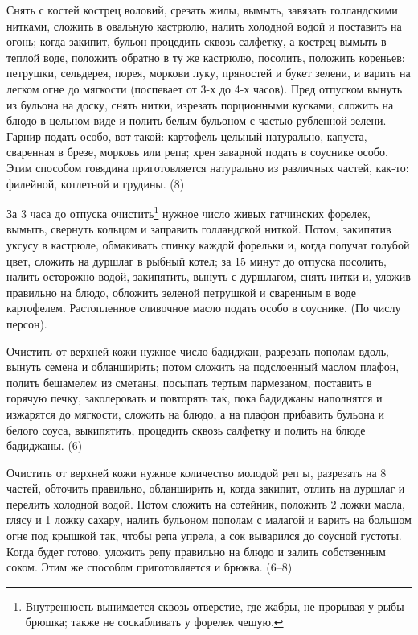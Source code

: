
Снять с костей кострец воловий, срезать жилы, вымыть, завязать голландскими нитками, сложить в овальную кастрюлю, налить холодной водой и поставить на огонь; когда закипит, бульон процедить сквозь салфетку, а кострец вымыть в теплой воде, положить обратно в ту же кастрюлю, посолить, положить кореньев: петрушки, сельдерея, порея, моркови луку, пряностей и букет зелени, и варить на легком огне до мягкости (поспевает от 3-х до 4-х часов). Пред отпуском вынуть из бульона на доску, снять нитки, изрезать порционными кусками, сложить на блюдо в цельном виде и полить белым бульоном с частью рубленной зелени. Гарнир подать особо, вот такой: картофель цельный натурально, капуста, сваренная в брезе, морковь или репа; хрен заварной подать в соуснике особо. Этим способом говядина приготовляется натурально из различных частей, как-то: филейной, котлетной и грудины. (8) 


За 3 часа до отпуска очистить\footnote{Внутренность вынимается сквозь отверстие, где жабры, не прорывая у рыбы брюшка; также не соскабливать у форелек чешую.} нужное число живых гатчинских форелек, вымыть, свернуть кольцом и заправить голландской ниткой. Потом, закипятив уксусу в кастрюле, обмакивать спинку каждой форельки и, когда получат голубой цвет, сложить на дуршлаг в рыбный котел; за 15 минут до отпуска посолить, налить осторожно водой, закипятить, вынуть с дуршлагом, снять нитки и, уложив правильно на блюдо, обложить зеленой петрушкой и сваренным в воде картофелем. Растопленное сливочное масло подать особо в соуснике. (По числу персон). 


Очистить от верхней кожи нужное число бадиджан, разрезать пополам вдоль, вынуть семена и обланширить; потом сложить на подслоенный маслом плафон, полить бешамелем из сметаны, посыпать тертым пармезаном, поставить в горячую печку, заколеровать и повторять так, пока бадиджаны наполнятся и изжарятся до мягкости, сложить на блюдо, а на плафон прибавить бульона и белого соуса, выкипятить, процедить сквозь салфетку и полить на блюде бадиджаны. (6)


Очистить от верхней кожи нужное количество молодой реп ы, разрезать на 8 частей, обточить правильно, обланширить и, когда закипит, отлить на дуршлаг и перелить холодной водой. Потом сложить на сотейник, положить 2 ложки масла, глясу и 1 ложку сахару, налить бульоном пополам с малагой и варить на большом огне под крышкой так, чтобы репа упрела, а сок выварился до соусной густоты. Когда будет готово, уложить репу правильно на блюдо и залить собственным соком. Этим же способом приготовляется и брюква. (6--8) 

